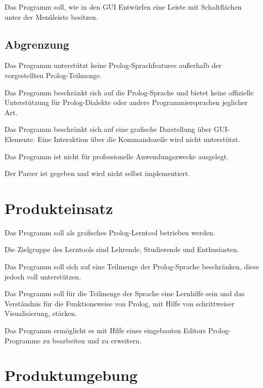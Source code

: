 \documentclass[parskip=full,11pt,twoside]{scrartcl}
\begin{document}
Das Programm soll, wie in den GUI Entwürfen eine Leiste mit Schaltflächen unter der Menüleiste besitzen.

\subsection{Abgrenzung}


Das Programm unterstützt keine Prolog-Sprachfeatures außerhalb der vorgestellten Prolog-Teilmenge.


Das Programm beschränkt sich auf die Prolog-Sprache und bietet keine offizielle Unterstützung für Prolog-Dialekte oder andere Programmiersprachen jeglicher Art.


Das Programm beschränkt sich auf eine grafische Darstellung über GUI-Elemente. Eine Interaktion über die Kommandozeile wird nicht unterstützt.


Das Programm ist nicht für professionelle Anwendungszwecke ausgelegt.


Der Parser ist gegeben und wird nicht selbst implementiert.

\section{Produkteinsatz}

Das Programm soll als grafisches Prolog-Lerntool betrieben werden.

Die Zielgruppe des Lerntools sind Lehrende, Studierende und Enthusiasten.

Das Programm soll sich auf eine Teilmenge der Prolog-Sprache beschränken, diese jedoch voll unterstützen.

Das Programm soll für die Teilmenge der Sprache eine Lernhilfe sein und das Verständnis für die Funktionsweise von Prolog, mit Hilfe von schrittweiser Visualisierung, stärken.

Das Programm ermöglicht es mit Hilfe eines eingebauten Editors Prolog-Programme zu bearbeiten und zu erweitern.

\section{Produktumgebung}
\end{document}
